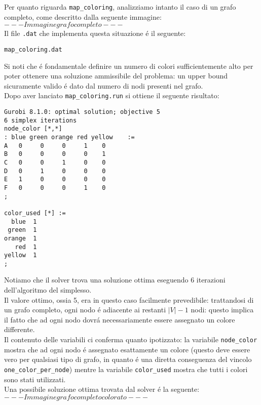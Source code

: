 \documentclass{article}
\begin{document}
Per quanto riguarda \texttt{map\_coloring}, analizziamo intanto il caso di un grafo completo, come descritto dalla seguente immagine:\\

$ --- Immagine grafo completo --- $\\

Il file \texttt{.dat} che implementa questa situazione \'e il seguente:

\texttt{map\_coloring.dat}


Si noti che \'e fondamentale definire un numero di colori sufficientemente alto per poter ottenere una soluzione ammissibile del problema: un upper bound sicuramente valido \'e dato dal numero di nodi presenti nel grafo.\\

Dopo aver lanciato \texttt{map\_coloring.run} si ottiene il seguente risultato:\\
\begin{verbatim}
Gurobi 8.1.0: optimal solution; objective 5
6 simplex iterations
node_color [*,*]
: blue green orange red yellow    :=
A   0     0     0     1    0
B   0     0     0     0    1
C   0     0     1     0    0
D   0     1     0     0    0
E   1     0     0     0    0
F   0     0     0     1    0
;

color_used [*] :=
  blue  1
 green  1
orange  1
   red  1
yellow  1
;
\end{verbatim}

Notiamo che il solver trova una soluzione ottima eseguendo 6 iterazioni dell'algoritmo del simplesso.\\
Il valore ottimo, ossia 5, era in questo caso facilmente prevedibile: trattandosi di un grafo completo, ogni nodo \'e adiacente ai restanti $|V| - 1$ nodi: questo implica il fatto che ad ogni nodo dovr\'a necessariamente essere assegnato un colore differente.\\
Il contenuto delle variabili ci conferma quanto ipotizzato: la variabile \texttt{node\_color} mostra che ad ogni nodo \'e assegnato esattamente un colore (questo deve essere vero per qualsiasi tipo di grafo, in quanto \'e una diretta conseguenza del vincolo \texttt{one\_color\_per\_node}) mentre la variabile \texttt{color\_used} mostra che tutti i colori sono stati utilizzati.\\

Una possibile soluzione ottima trovata dal solver \'e la seguente:\\

$ --- Immagine grafo completo colorato --- $\\
\end{document}
